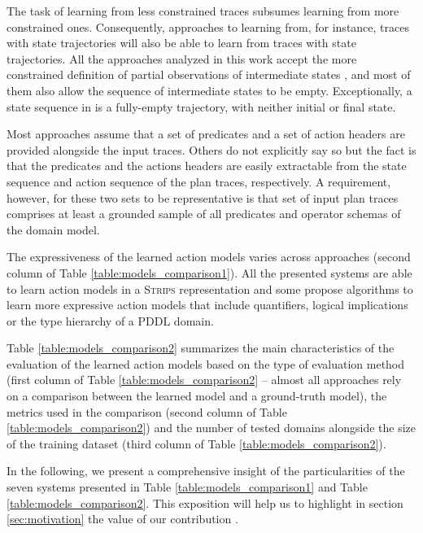 The task of learning from less constrained traces subsumes learning from more constrained ones. Consequently, approaches to learning from, for instance, traces with \PO state trajectories will also be able to learn from traces with \POstar state trajectories. All the approaches analyzed in this work accept the more constrained definition of partial observations of intermediate states \POstar, and most of them also allow the sequence of intermediate states to be empty. Exceptionally, a \NO state sequence in \LOCM is a fully-empty trajectory, with neither initial or final state.


Most approaches assume that a set of predicates and a set of action headers are provided alongside the input traces. Others do not explicitly say so but the fact is that the predicates and the actions headers are easily extractable from the state sequence and action sequence of the plan traces, respectively. A requirement, however, for these two sets to be representative is that set of input plan traces comprises at least a grounded sample of all predicates and operator schemas of the domain model.

The expressiveness of the learned action models varies across approaches (second column of Table \ref{table:models_comparison1}). All the presented systems are able to learn action models in a \textsc{Strips}  representation \cite{fikes1971strips} and some propose algorithms to learn more expressive action models that include quantifiers, logical implications or the type hierarchy of a PDDL domain.

Table \ref{table:models_comparison2} summarizes the main characteristics of the evaluation of the learned action models based on the type of evaluation method (first column of Table \ref{table:models_comparison2} -- almost all approaches rely on a comparison between the learned model and a ground-truth model), the metrics used in the comparison (second column of Table \ref{table:models_comparison2}) and the number of tested domains alongside the size of the training dataset (third column of Table \ref{table:models_comparison2}).

In the following, we present a comprehensive insight of the particularities of the seven systems presented in Table \ref{table:models_comparison1} and Table \ref{table:models_comparison2}. This exposition will help us to highlight in section \ref{sec:motivation} the value of our contribution \FAMA.


